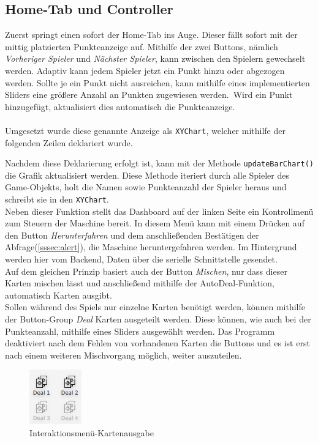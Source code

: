\subsection{Home-Tab und Controller}
Zuerst springt einen sofort der Home-Tab ins Auge.
Dieser fällt sofort mit der mittig platzierten Punkteanzeige auf.
Mithilfe der zwei Buttons, nämlich \textit{Vorheriger Spieler} und \textit{Nächster Spieler}, kann zwischen den Spielern gewechselt werden.
Adaptiv kann jedem Spieler jetzt ein Punkt hinzu oder abgezogen werden.
Sollte je ein Punkt nicht ausreichen, kann mithilfe eines implementierten Sliders eine größere Anzahl an Punkten zugewiesen werden.\
Wird ein Punkt hinzugefügt, aktualisiert dies automatisch die Punkteanzeige.\\\\
Umgesetzt wurde diese genannte Anzeige als \lstinline[style=java]{XYChart}, welcher mithilfe der folgenden Zeilen deklariert wurde.

Nachdem diese Deklarierung erfolgt ist, kann mit der Methode \lstinline[style=java]{updateBarChart()} die Grafik aktualisiert werden.
Diese Methode iteriert durch alle Spieler des Game-Objekts, holt die Namen sowie Punkteanzahl der Spieler heraus und schreibt sie in den \lstinline[style=java]{XYChart}.\\
Neben dieser Funktion stellt das Dashboard auf der linken Seite ein Kontrollmenü zum Steuern der Maschine bereit.
In diesem Menü kann mit einem Drücken auf den Button \textit{Herunterfahren} und dem anschließenden Bestätigen der Abfrage(\autoref{sssec:alert}), die Maschine heruntergefahren werden.
Im Hintergrund werden hier vom Backend, Daten über die serielle Schnittstelle gesendet.\\
Auf dem gleichen Prinzip basiert auch der Button \textit{Mischen}, nur dass dieser Karten mischen lässt und anschließend mithilfe der AutoDeal-Funktion, automatisch Karten ausgibt.\\
Sollen während des Spiels nur einzelne Karten benötigt werden, können mithilfe der Button-Group \textit{Deal} Karten ausgeteilt werden.
Diese können, wie auch bei der Punkteanzahl, mithilfe eines Sliders ausgewählt werden.
Das Programm deaktiviert nach dem Fehlen von vorhandenen Karten die Buttons und es ist erst nach einem weiteren Mischvorgang möglich, weiter auszuteilen.\\
\begin{figure}[H]
\centering
\vspace{-5mm}
\includegraphics[width=0.2\textwidth]{fig/ainf/Interface.png}
\caption{Interaktionsmenü-Kartenausgabe}
\label{interface}
\end{figure}
